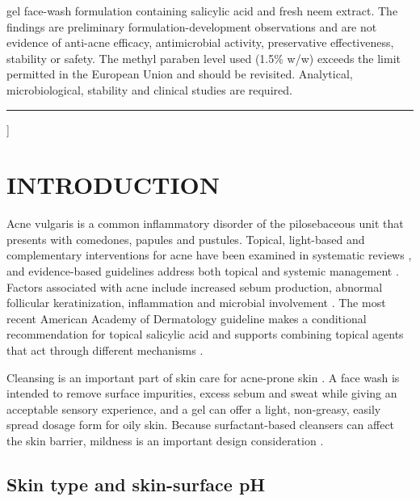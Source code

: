 \documentclass[10pt,a4paper,twocolumn]{article}
\begin{document}
{\begin{minipage}[t]{0.64\textwidth}
gel face-wash formulation containing salicylic acid and fresh neem
extract. The findings are preliminary formulation-development observations
and are not evidence of anti-acne efficacy, antimicrobial activity,
preservative effectiveness, stability or safety. The methyl paraben level
used (1.5\% w/w) exceeds the limit permitted in the European Union and
should be revisited. Analytical, microbiological, stability and clinical
studies are required.
  \end{minipage}\par
  \vspace{0.5cm}
  \noindent\rule{\textwidth}{0.8pt}
  \vspace{0.5cm}
}]

\section{INTRODUCTION}

Acne vulgaris is a common inflammatory disorder of the pilosebaceous
unit that presents with comedones, papules and pustules. Topical,
light-based and complementary interventions for acne have been examined
in systematic reviews \citep{yuan2024}, and evidence-based guidelines
address both topical and systemic management
\citep{zaenglein2016,reynolds2024}. Factors associated with acne include
increased sebum production, abnormal follicular keratinization,
inflammation and microbial involvement \citep{zaenglein2016}. The most
recent American Academy of Dermatology guideline makes a conditional
recommendation for topical salicylic acid and supports combining topical
agents that act through different mechanisms \citep{reynolds2024}.

Cleansing is an important part of skin care for acne-prone skin
\citep{decker2012,delrosso2013}. A face wash is intended to remove
surface impurities, excess sebum and sweat while giving an acceptable
sensory experience, and a gel can offer a light, non-greasy, easily
spread dosage form for oily skin. Because surfactant-based cleansers can
affect the skin barrier, mildness is an important design consideration
\citep{ananthapadmanabhan2004,subramanyan2004}.

\subsection{Skin type and skin-surface pH}
\end{document}
